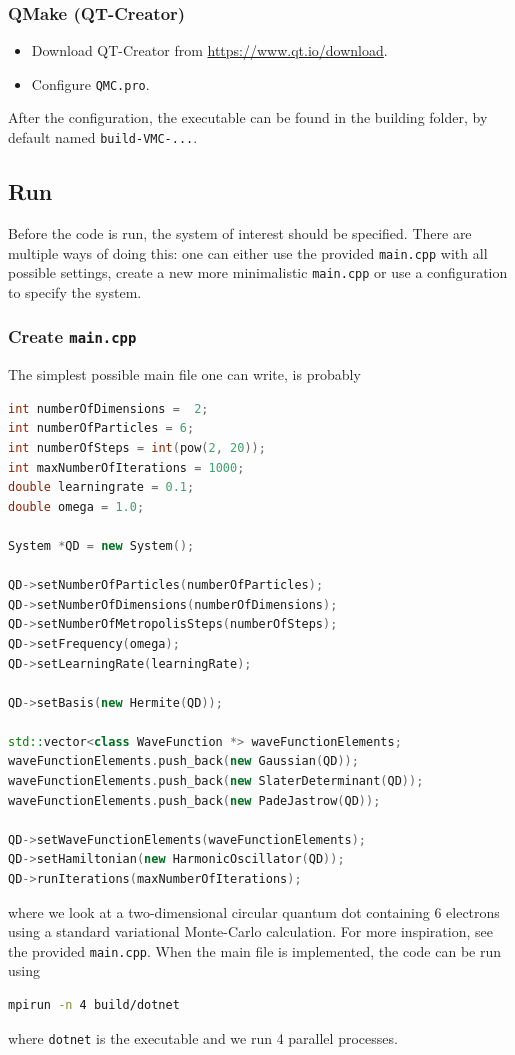 \subsubsection{QMake (QT-Creator)}
\begin{itemize}
	\item Download QT-Creator from \url{https://www.qt.io/download}.
	\item Configure \texttt{QMC.pro}.
\end{itemize}
After the configuration, the executable can be found in the building folder, by default named \texttt{build-VMC-...}.

\subsection{Run}
Before the code is run, the system of interest should be specified. There are multiple ways of doing this: one can either use the provided \texttt{main.cpp} with all possible settings, create a new more minimalistic \texttt{main.cpp} or use a configuration to specify the system. 

\subsubsection{Create \texttt{main.cpp}}
The simplest possible main file one can write, is probably
\lstset{basicstyle=\scriptsize}
\begin{lstlisting}[language={C++}]
int numberOfDimensions =  2;
int numberOfParticles = 6;
int numberOfSteps = int(pow(2, 20));
int maxNumberOfIterations = 1000;
double learningrate = 0.1;
double omega = 1.0;

System *QD = new System();

QD->setNumberOfParticles(numberOfParticles);
QD->setNumberOfDimensions(numberOfDimensions);
QD->setNumberOfMetropolisSteps(numberOfSteps);
QD->setFrequency(omega);
QD->setLearningRate(learningRate);

QD->setBasis(new Hermite(QD));

std::vector<class WaveFunction *> waveFunctionElements;
waveFunctionElements.push_back(new Gaussian(QD));
waveFunctionElements.push_back(new SlaterDeterminant(QD));
waveFunctionElements.push_back(new PadeJastrow(QD));

QD->setWaveFunctionElements(waveFunctionElements);
QD->setHamiltonian(new HarmonicOscillator(QD));
QD->runIterations(maxNumberOfIterations);
\end{lstlisting}
where we look at a two-dimensional circular quantum dot containing 6 electrons using a standard variational Monte-Carlo calculation. For more inspiration, see the provided \texttt{main.cpp}. When the main file is implemented, the code can be run using
\lstset{basicstyle=\scriptsize}
\begin{lstlisting}[language={bash}]
mpirun -n 4 build/dotnet
\end{lstlisting}
where \texttt{dotnet} is the executable and we run 4 parallel processes. 


